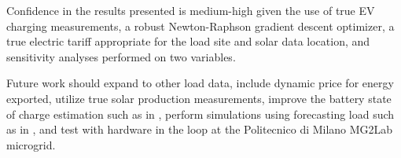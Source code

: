 \documentclass[conference]{IEEEtran}
\begin{document}

Confidence in the results presented is medium-high given the use of true EV charging measurements, a robust Newton-Raphson gradient descent optimizer, a true electric tariff appropriate for the load site and solar data location, and sensitivity analyses performed on two variables.

Future work should expand to other load data, include dynamic price for energy exported, utilize true solar production measurements, improve the battery state of charge estimation such as in \cite{Eleftheriadis2023}, perform simulations using forecasting load such as in \cite{Wood2023}, and test with hardware in the loop at the Politecnico di Milano MG2Lab microgrid.


\vspace{12pt}
\end{document}
